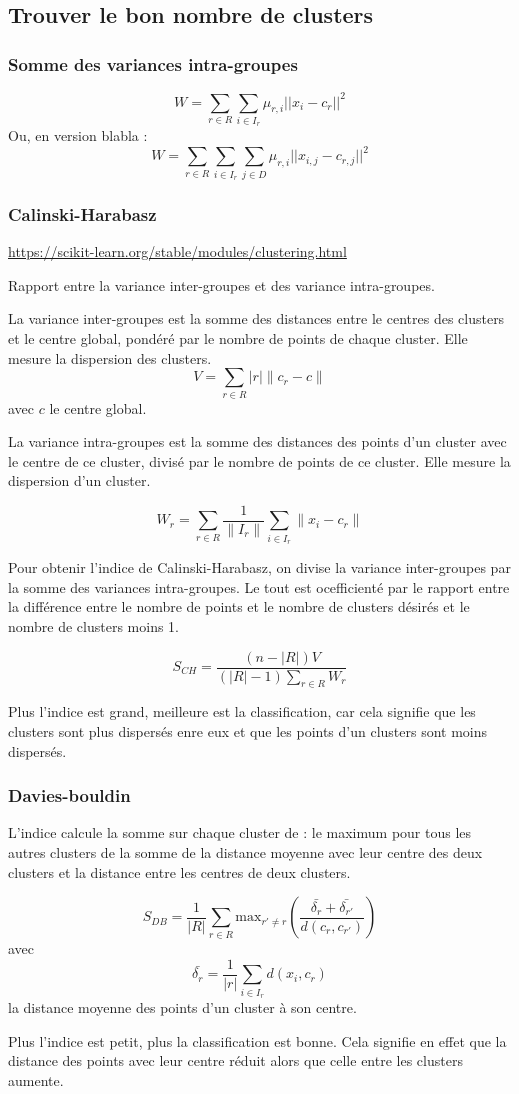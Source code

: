 \subsection{Trouver le bon nombre de clusters}
\subsubsection{Somme des variances intra-groupes}
\[
W  = \sum_{r\in R}\sum_{i\in I_r}\mu_{r,i}||x_{i}-c_{r}||^2
\]
Ou, en version blabla :
\[
W  = \sum_{r\in R}\sum_{i\in I_r}\sum_{j\in D}\mu_{r,i}||x_{i,j}-c_{r,j}||^2
\]

\subsubsection{Calinski-Harabasz}
\url{https://scikit-learn.org/stable/modules/clustering.html}


Rapport entre la variance inter-groupes et des variance intra-groupes.

La variance inter-groupes est la somme des distances entre le centres des clusters et le centre global, pondéré par le nombre de points de chaque cluster. Elle mesure la dispersion des clusters.
\[
V = \sum_{r\in R}|r| \|c_{r}-c\|
\]
avec $c$ le centre global.

La variance intra-groupes est la somme des distances des points d'un cluster avec le centre de ce cluster, divisé par le nombre de points de ce cluster. Elle mesure la dispersion d'un cluster.

\[
W_r = \sum_{r\in R}\frac{1}{\|I_r\|}\sum_{i\in I_r}\|x_{i}-c_{r}\|
\]

Pour obtenir l'indice de Calinski-Harabasz, on divise la variance inter-groupes par la somme des variances intra-groupes. Le tout est ocefficienté par le rapport entre la différence entre le nombre de points et le nombre de clusters désirés et le nombre de clusters moins 1.

\[
S_{CH} = \frac{(n-|R|)V}{(|R|-1)\sum_{r\in R}W_r}
\]

Plus l'indice est grand, meilleure est la classification, car cela signifie que les clusters sont plus dispersés enre eux et que les points d'un clusters sont moins dispersés.

\subsubsection{Davies-bouldin}
L'indice calcule la somme sur chaque cluster de : le maximum pour tous les autres clusters de la somme de la distance moyenne avec leur centre des deux clusters et la distance entre les centres de deux clusters.

\[
S_{DB}  = \frac{1}{|R|}\sum_{r\in R}\mathrm{max}_{r'\neq r}\left(\frac{\bar{\delta_r}+\bar{\delta_{r'}}}{d(c_r,c_{r'})}\right)
\]
avec
\[\bar{\delta_r} = \frac{1}{|r|}\sum_{i \in I_r}d(x_i,c_r)\]
la distance moyenne des points d'un cluster à son centre.

Plus l'indice est petit, plus la classification est bonne. Cela signifie en effet que la distance des points avec leur centre réduit alors que celle entre les clusters aumente.
